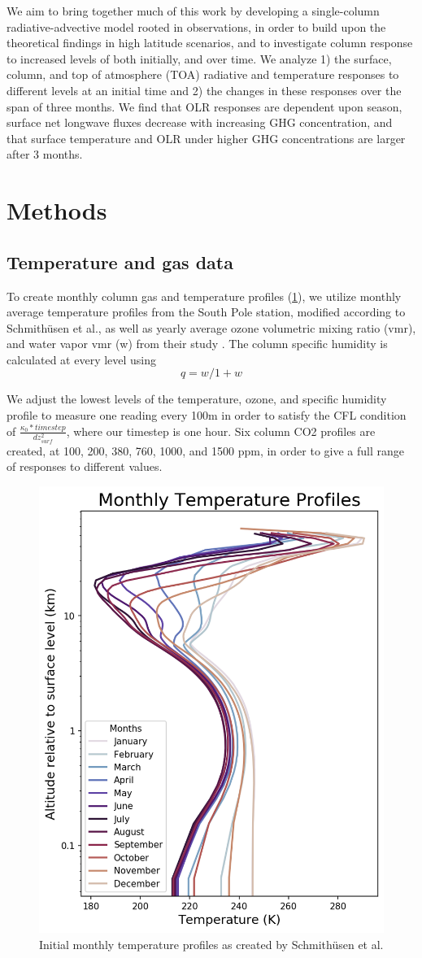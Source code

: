 \documentclass[12]{article}
\begin{document}
We aim to bring together much of this work by developing a single-column radiative-advective model rooted in observations, in order to build upon the theoretical findings in high latitude scenarios, and to investigate column response to increased levels of  both initially, and over time. We analyze 1) the surface, column, and top of atmosphere (TOA) radiative and temperature responses to different  levels at an initial time and 2) the changes in these responses over the span of three months. We find that OLR responses are dependent upon season, surface net longwave fluxes decrease with increasing GHG concentration, and that surface temperature and OLR under higher GHG concentrations are larger after 3 months.


\section{Methods}
\subsection{Temperature and gas data}
 To create monthly column gas and temperature profiles (\ref{fig:temperature_profiles}), we utilize monthly average temperature profiles from the South Pole station, modified according to Schmithüsen et al., as well as yearly average ozone volumetric mixing ratio (vmr), and water vapor vmr (w) from their study  \citep{schmithusen_how_2015}. The column specific humidity is calculated at every level using
\begin{equation}
    q = w/1+w
\end{equation}

 We adjust the lowest levels of the temperature, ozone, and specific humidity profile to measure one reading every 100m in order to satisfy the CFL condition of $\frac{\kappa_0*timestep}{dz^2_{surf}}$, where our timestep is one hour. Six column CO2 profiles are created, at 100, 200, 380, 760, 1000, and 1500 ppm, in order to give a full range of responses to different values. 

\begin{figure}[htb!]
\noindent\includegraphics[width=.5\textwidth]{figures/initial_temperature_profiles.png}
\centering
\caption{Initial monthly temperature profiles as created by Schmithüsen et al.}
\label{fig:temperature_profiles}
\end{figure}
\end{document}
